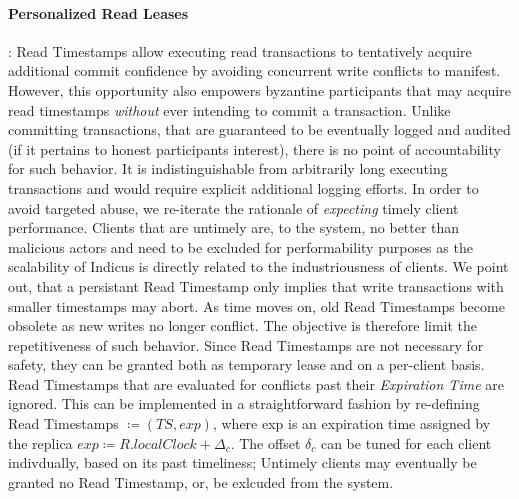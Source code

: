 \fi



\paragraph{Personalized Read Leases}: 
Read Timestamps allow executing read transactions to tentatively acquire additional commit confidence by avoiding concurrent write conflicts to manifest. However, this opportunity also empowers byzantine participants that may acquire read timestamps \textit{without} ever intending to commit a transaction. Unlike committing transactions, that are guaranteed to be eventually logged and audited (if it pertains to honest participants interest), there is no point of accountability for such behavior. It is indistinguishable from arbitrarily long executing transactions and would require explicit additional logging efforts. In order to avoid targeted abuse, we re-iterate the rationale of \textit{expecting} timely client performance. Clients that are untimely are, to the system, no better than malicious actors and need to be excluded for performability purposes as the scalability of Indicus is directly related to the industriousness of clients. 
We point out, that a persistant Read Timestamp only implies that write transactions with smaller timestamps may abort. As time moves on, old Read Timestamps become obsolete as new writes no longer conflict. The objective is therefore limit the repetitiveness of such behavior.
Since Read Timestamps are not necessary for safety, they can be granted both as temporary lease and on a per-client basis. Read Timestamps that are evaluated for conflicts past their \textit{Expiration Time} are ignored. This can be implemented in a straightforward fashion by re-defining Read Timestamps $\coloneqq (TS, exp )$, where exp is an expiration time assigned by the replica $exp \coloneqq R.localClock + \Delta_c$. The offset $\delta_c$ can be tuned for each client indivdually, based on its past timeliness; Untimely clients may eventually be granted no Read Timestamp, or, be exlcuded from the system.



